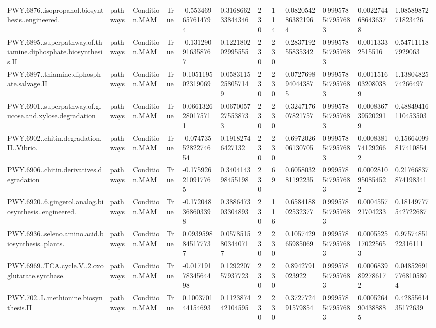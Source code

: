 \begin{longtable}{llllllllllll}
PWY.6876..isopropanol.biosynthesis..engineered. & pathways & Condition.MAM & True & -0.553469657614794 & 0.316866233844346 & 230 & 114 & 0.0820542863821964 & 0.999578547957683 & 0.0022744686436378 & 1.0858987271823426 \\
PWY.6895..superpathway.of.thiamine.diphosphate.biosynthesis.II & pathways & Condition.MAM & True & -0.131290916358767 & 0.122180202995555 & 230 & 230 & 0.283719255835342 & 0.999578547957683 & 0.00113332515516 & 0.547111187929063 \\
PWY.6897..thiamine.diphosphate.salvage.II & pathways & Condition.MAM & True & 0.105119502319069 & 0.0583115258057149 & 230 & 230 & 0.0727698940443875 & 0.999578547957683 & 0.0011516032080389 & 1.1380482574266497 \\
PWY.6901..superpathway.of.glucose.and.xylose.degradation & pathways & Condition.MAM & True & 0.0661326280175711 & 0.0670057275538733 & 230 & 230 & 0.324717607821757 & 0.999578547957683 & 0.0008367395202919 & 0.48849416110453503 \\
PWY.6902..chitin.degradation.II..Vibrio. & pathways & Condition.MAM & True & -0.0747355282274654 & 0.19182746427132 & 230 & 230 & 0.697202606130705 & 0.999578547957683 & 0.0008381741292662 & 0.15664099817410854 \\
PWY.6906..chitin.derivatives.degradation & pathways & Condition.MAM & True & -0.175926210917765 & 0.340414398455198 & 230 & 69 & 0.605803281192235 & 0.999578547957683 & 0.0002810950854522 & 0.21766837874198341 \\
PWY.6920..6.gingerol.analog.biosynthesis..engineered. & pathways & Condition.MAM & True & -0.172048368603398 & 0.388647303304893 & 230 & 116 & 0.658418802532377 & 0.999578547957683 & 0.000455721704233 & 0.18149777542722687 \\
PWY.6936..seleno.amino.acid.biosynthesis..plants. & pathways & Condition.MAM & True & 0.0939598845177737 & 0.0578515803440717 & 230 & 230 & 0.105742965985069 & 0.999578547957683 & 0.0005525170225653 & 0.9757485122316111 \\
PWY.6969..TCA.cycle.V..2.oxoglutarate.synthase. & pathways & Condition.MAM & True & -0.0171917834564498 & 0.129220757937723 & 230 & 230 & 0.8942791023922 & 0.999578547957683 & 0.0006839892786172 & 0.048526917768105804 \\
PWY.702..L.methionine.biosynthesis.II & pathways & Condition.MAM & True & 0.100370144154693 & 0.112387442104595 & 230 & 230 & 0.372772491579854 & 0.999578547957683 & 0.0005264904388885 & 0.4285561435172639 \\

\end{longtable}
